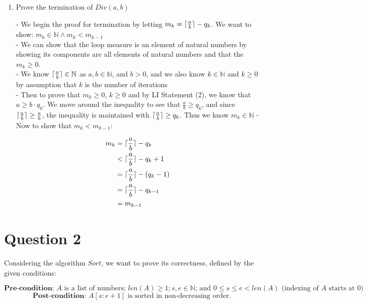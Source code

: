 \documentclass[20pt]{article}
\DeclarePairedDelimiter{\ceil}{\lceil}{\rceil}
\begin{document}
\begin{enumerate}[label=(\alph*),leftmargin=0cm]
    
    \item
    \begin{text}
        Prove the termination of $Div(a,b)$
    \end{text}
    
    \begin{text}
        - We begin the proof for termination by letting $m_k = \ceil{\frac{a}{b}} - q_k$. We want to show: $m_k \in \mathbb{N} \land m_k < m_{k-1}$\\
        - We can show that the loop measure is an element of natural numbers by showing its components are all elements of natural numbers and that the $m_k \geq 0$.\\
        - We know $\ceil{\frac{a}{b}} \in \mathbb{N}$ as $a, b \in \mathbb{N}$, and $b > 0$, and we also know $k \in \mathbb{N}$ and $k \geq 0$ by assumption that $k$ is the number of iterations\\
        - Then to prove that $m_k \geq 0$, $k \geq 0$ and by LI Statement (2), we know that $a \geq b \cdot q_k$. We move around the inequality to see that $\frac{a}{b} \geq q_k$, and since $\ceil{ \frac{a}{b} } \geq \frac{a}{b}$, the inequality is maintained with $\ceil{ \frac{a}{b} } \geq q_k$. Thus we know $m_k \in \mathbb{N}$
        - Now to show that $m_k < m_{k-1}$:
        
        \begin{align}
            m_k &= \ceil{\frac{a}{b}} - q_k \nonumber\\
            &< \ceil{\frac{a}{b}} - q_k + 1\nonumber\\
            &= \ceil{\frac{a}{b}} - (q_k - 1)\nonumber\\
            &= \ceil{\frac{a}{b}} - q_{k-1}\nonumber\\
            &= m_{k-1}\nonumber
        \end{align}
    \end{text}
    \hfill \blacksquare
\end{enumerate}


\newpage

\section*{Question 2}

\begin{text}
    Considering the algorithm $Sort$, we want to prove its correctness, defined by the given conditions:
\end{text}
\begin{equation}
    \textbf{Pre-condition: } \text{$A$ is a list of numbers; $len(A) \geq 1; s, e \in \mathbb{N}$; and $0 \leq s \leq e < len(A)$ (indexing of $A$ starts at 0)}\nonumber
\end{equation}
\begin{equation}
    \textbf{Post-condition: } \text{$A[s : e + 1]$ is sorted in non-decreasing order.}\nonumber
\end{equation}
\end{document}
